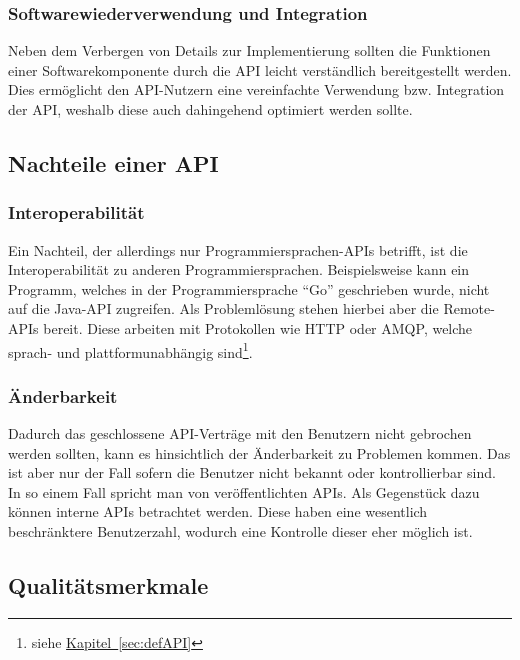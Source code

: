 \subsubsection{Softwarewiederverwendung und Integration}
Neben dem Verbergen von Details zur Implementierung sollten die Funktionen einer Softwarekomponente durch die \gls{API} leicht verständlich bereitgestellt werden. Dies ermöglicht den \gls{API}-Nutzern eine vereinfachte Verwendung bzw. Integration der \gls{API}, weshalb diese auch dahingehend optimiert werden sollte.

\subsection{Nachteile einer API}
\subsubsection{Interoperabilität}
Ein Nachteil, der allerdings nur Programmiersprachen-\glspl{API} betrifft, ist die Interoperabilität zu anderen Programmiersprachen. Beispielsweise kann ein Programm, welches in der Programmiersprache \enquote{Go} geschrieben wurde, nicht auf die Java-\gls{API} zugreifen. Als Problemlösung stehen hierbei aber die Remote-\glspl{API} bereit. Diese arbeiten mit Protokollen wie \gls{HTTP} oder \gls{AMQP}, welche sprach- und plattformunabhängig sind\footnote{siehe \hyperref[sec:defAPI]{Kapitel~\ref{sec:defAPI}}}.

\subsubsection{Änderbarkeit}
Dadurch das geschlossene \gls{API}-Verträge mit den Benutzern nicht gebrochen werden sollten, kann es hinsichtlich der Änderbarkeit zu Problemen kommen. Das ist aber nur der Fall sofern die Benutzer nicht bekannt oder kontrollierbar sind. In so einem Fall spricht man von veröffentlichten \glspl{API}. Als Gegenstück dazu können interne \glspl{API} betrachtet werden. Diese haben eine wesentlich beschränktere Benutzerzahl, wodurch eine Kontrolle dieser eher möglich ist.

\subsection{Qualitätsmerkmale}\label{sec:qualityFeatures}
